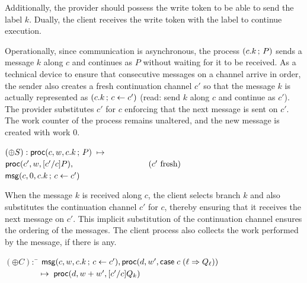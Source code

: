 Additionally, the provider should possess the write token to be able to send the
label $k$. Dually, the client receives the write token with the label to continue
execution.

Operationally, since communication is asynchronous, the process
$(c.k \, ; \, P)$ sends a message $k$
along $c$ and continues as $P$ without waiting for it to be received.
As a technical device to ensure that consecutive messages on a
channel arrive in order, the sender also creates a fresh continuation
channel $c'$ so that the message $k$ is actually represented as
$(c.k \, ; \, c \leftarrow c')$ (read: send $k$ along $c$ and
continue as $c'$). The provider substitutes $c'$ for $c$ enforcing
that the next message is sent on $c'$.
The work counter of the process remains unaltered, and the new message
is created with work $0$.
\begin{tabbing}
$(\oplus S) : \mathsf{proc}(c, w, c.k \, ; \, P) \; \mapsto \;$ \\
\qquad \qquad $\mathsf{proc}(c', w, [c'/c]P), \qquad \qquad \qquad \qquad \quad (c' \text{ fresh})$ \\
\qquad \qquad $\mathsf{msg}(c, 0, c.k \, ; \, c \leftarrow c') $
\end{tabbing}
When the message $k$ is received along $c$, the client selects branch
$k$ and also substitutes the continuation channel $c'$ for $c$, thereby
ensuring that it receives the next message on $c'$. This implicit
substitution of the continuation channel ensures the ordering of the
messages.
The client process also collects the work performed by the message, if
there is any.
\begin{tabbing}
$(\oplus C) :$ \= $\mathsf{msg}(c, w, c.k \, ; \, c \leftarrow c'),
\mathsf{proc}(d, w', \mathsf{case} \; c \; (\ell \Rightarrow Q_\ell))$ \\
$\qquad \qquad \; \mapsto \; \mathsf{proc}(d, w+w',[c'/c]Q_k)$
\end{tabbing}

